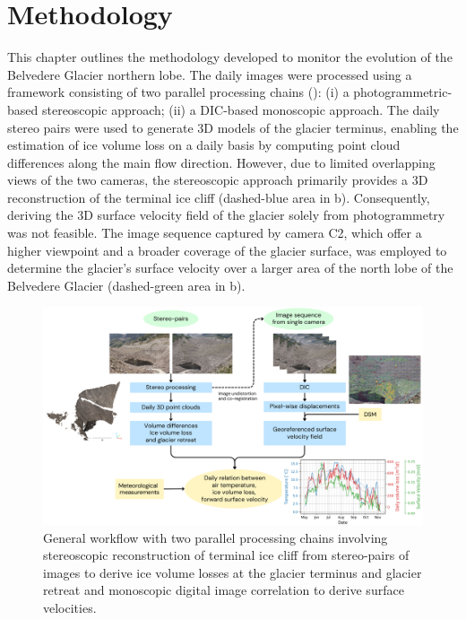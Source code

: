 \section{Methodology}\label{sec:4:methodology}
This chapter outlines the methodology developed to monitor the evolution of the Belvedere
Glacier northern lobe.
The daily images were processed using a framework consisting of two parallel processing
chains ():
(i) a photogrammetric-based stereoscopic approach;
(ii) a DIC-based monoscopic approach.
The daily stereo pairs were used to generate 3D models of the glacier terminus,
enabling the estimation of ice volume loss on a daily basis by computing point cloud
differences along the main flow direction.
However, due to limited overlapping views of the two cameras, the stereoscopic approach
primarily provides a 3D reconstruction of the terminal ice cliff (dashed-blue area in
b).
Consequently, deriving the 3D surface velocity field of the glacier solely from
photogrammetry was not feasible.
The image sequence captured by camera C2, which offer a higher viewpoint and a broader coverage of the glacier surface, was employed to determine the glacier's surface velocity
over a larger area of the north lobe of the Belvedere Glacier (dashed-green area in
b).

\begin{figure}[ht]
  \centering
  \includegraphics[width=\textwidth]{3_general_workflow.png}
  \caption{General workflow with two parallel processing chains involving stereoscopic
    reconstruction of terminal ice cliff from stereo-pairs of images to derive ice volume
    losses at the glacier terminus and glacier retreat and monoscopic digital image
    correlation to derive surface velocities.}
  \label{fig:4:workflow}
\end{figure}

